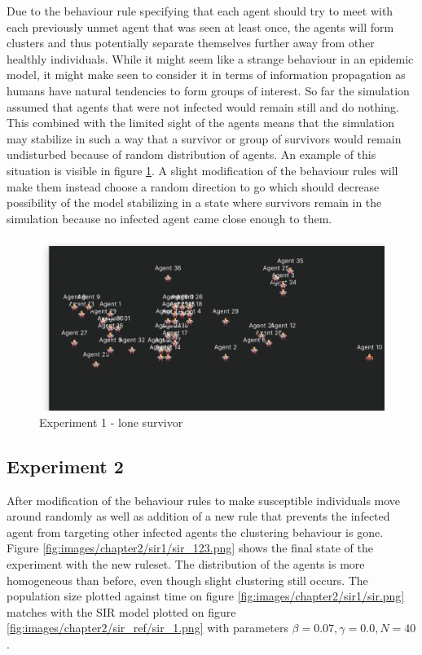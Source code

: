 Due to the behaviour rule specifying that each agent should try to meet with each previously unmet agent that was seen at least once, the agents will form clusters and thus potentially separate themselves further away from other healthly individuals.
While it might seem like a strange behaviour in an epidemic model, it might make seen to consider it in terms of information propagation as humans have natural tendencies to form groups of interest.
So far the simulation assumed that agents that were not infected would remain still and do nothing.
This combined with the limited sight of the agents means that the simulation may stabilize in such a way that a survivor or group of survivors would remain undisturbed because of random distribution of agents.
An example of this situation is visible in figure \ref{fig:images/chapter2/sir0/sir_255.png}.
A slight modification of the behaviour rules will make them instead choose a random direction to go which should decrease possibility of the model stabilizing in a state where survivors remain in the simulation because no infected agent came close enough to them.

\begin{figure}[H]
    \centering
    \includegraphics[width=1.0\textwidth]{images/chapter2/sir0/sir_255.png}
    \caption{Experiment 1 - lone survivor}\label{fig:images/chapter2/sir0/sir_255.png}
\end{figure}

\subsection{Experiment 2}

After modification of the behaviour rules to make susceptible individuals move around randomly as well as addition of a new rule that prevents the infected agent from targeting other infected agents the clustering behaviour is gone.
Figure \ref{fig:images/chapter2/sir1/sir_123.png} shows the final state of the experiment with the new ruleset.
The distribution of the agents is more homogeneous than before, even though slight clustering still occurs.
The population size plotted against time on figure \ref{fig:images/chapter2/sir1/sir.png} matches with the SIR model plotted on figure \ref{fig:images/chapter2/sir_ref/sir_1.png} with parameters $\beta = 0.07, \gamma = 0.0, N = 40$.

